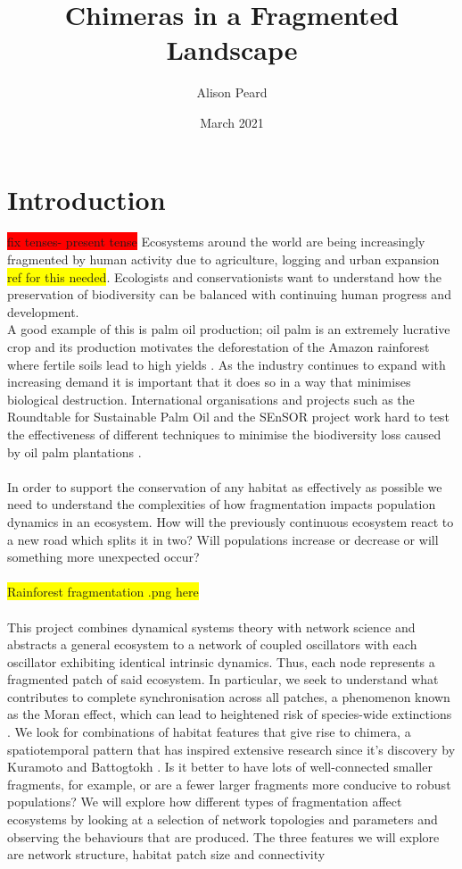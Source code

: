 \documentclass[12pt]{article}
\title{Chimeras in a Fragmented Landscape}
\author{Alison Peard}
\date{March 2021}
\begin{document}
\tableofcontents
\maketitle

\section{Introduction}\label{section:intro}
\colorbox{red}{fix tenses- present tense}
Ecosystems around the world are being increasingly fragmented by human activity due to agriculture, logging and urban expansion \cite{lucey2014,laurance2011} \colorbox{yellow}{ref for this needed}. Ecologists and conservationists want to understand how the preservation of biodiversity can be balanced with continuing human progress and development. \\ A good example of this is palm oil production; oil palm is an extremely lucrative crop and its production motivates the deforestation of the Amazon rainforest where fertile soils lead to high yields \cite{meijaard2018oil}. As the industry continues to expand with increasing demand it is important that it does so in a way that minimises biological destruction. International organisations and projects such as the Roundtable for Sustainable Palm Oil and the SEnSOR project work hard to test the effectiveness of different techniques to minimise the biodiversity loss caused by oil palm plantations \cite{scriven2019testing}. \\ \\ In order to support the conservation of any habitat as effectively as possible we need to understand the complexities of how fragmentation impacts population dynamics in an ecosystem. How will the previously continuous ecosystem react to a new road which splits it in two? Will populations increase or decrease or will something more unexpected occur?  \\ \\ \colorbox{yellow}{Rainforest fragmentation .png here} \\ \\ This project combines dynamical systems theory with network science and abstracts a general ecosystem to a network of coupled oscillators with each oscillator exhibiting identical intrinsic dynamics. Thus, each node represents a fragmented patch of said ecosystem. In particular, we seek to understand what contributes to complete synchronisation across all patches, a phenomenon known as the Moran effect, which can lead to heightened risk of species-wide extinctions \cite{hansen2020moran}. We look for combinations of habitat features that give rise to chimera, a spatiotemporal pattern that has inspired extensive research since it's discovery by Kuramoto and Battogtokh \cite{bera2017chimera}. Is it better to have lots of well-connected smaller fragments, for example, or are a fewer larger fragments more conducive to robust populations? We will explore how different types of fragmentation affect ecosystems by looking at a selection of network topologies and parameters and observing the behaviours that are produced. The three features we will explore are network structure, habitat patch size and connectivity 
\end{document}
